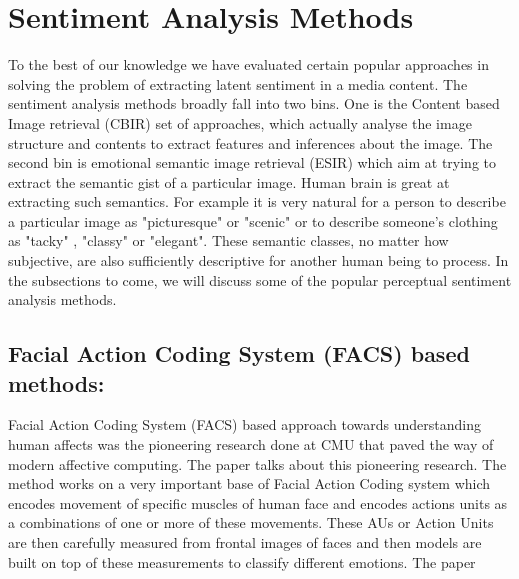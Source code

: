 \section{ Sentiment Analysis Methods }
To the best of our knowledge we have evaluated certain popular approaches in solving the problem of extracting latent sentiment in a media content. The sentiment analysis methods broadly fall into two bins. One is the Content based Image retrieval (CBIR) \cite{CBIRSurvey} set of approaches, which actually analyse the image structure and contents to extract features and inferences about the image. The second bin is emotional semantic image retrieval (ESIR) \cite{ESIRSurvey} which aim at trying to extract the semantic gist of a particular image. Human brain is great at extracting such semantics. For example it is very natural for a person to describe a particular image as "picturesque" or "scenic" or to describe someone's clothing as "tacky" , "classy" or "elegant". These semantic classes, no matter how subjective, are also sufficiently descriptive for another human being to process. 
In the subsections to come, we will discuss some of the popular perceptual sentiment analysis methods.


\subsection{Facial Action Coding System (FACS) based methods:}
Facial Action Coding System (FACS) based approach towards understanding human affects was the pioneering research done at CMU that paved the way of modern affective computing. The paper \cite{670980} talks about this pioneering research. The method works on a very important base of Facial Action Coding \cite{FACS} system which encodes movement of specific muscles of human face and encodes actions units as a combinations of one or more of these movements. These AUs or Action Units are then carefully measured from frontal images of faces and then models are built on top of these measurements to classify different emotions. The paper 

